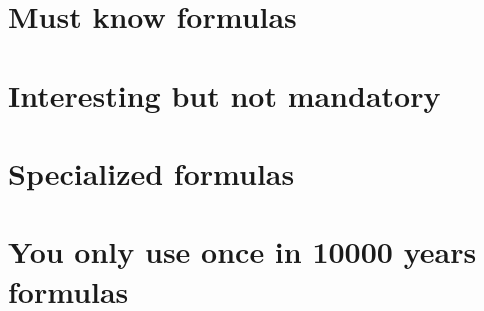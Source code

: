 \section{Must know formulas}
\section{Interesting but not mandatory}
\section{Specialized formulas}
\section{You only use once in 10000 years formulas}